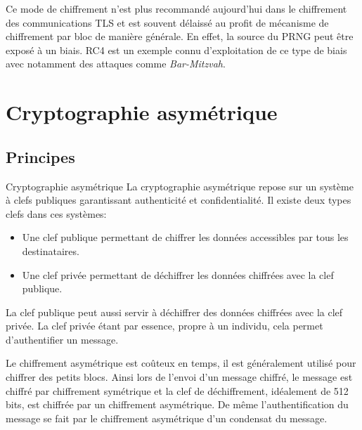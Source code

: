 Ce mode de chiffrement n'est plus recommandé aujourd'hui dans le chiffrement des communications TLS et est souvent délaissé au profit de mécanisme de chiffrement par bloc de manière générale. En effet, la source du PRNG peut être exposé à un biais. RC4 est un exemple connu d'exploitation de ce type de biais avec notamment des attaques comme \textit{Bar-Mitzvah}.\\


\section{Cryptographie asymétrique}
\subsection{Principes}
\begin{Define}{Cryptographie asymétrique}
La cryptographie asymétrique repose sur un système à clefs publiques garantissant authenticité et confidentialité. Il existe deux types clefs dans ces systèmes:\begin{itemize}
\item Une clef publique permettant de chiffrer les données accessibles par tous les destinataires.
\item Une clef privée permettant de déchiffrer les données chiffrées avec la clef publique.
\end{itemize}
La clef publique peut aussi servir à déchiffrer des données chiffrées avec la clef privée. La clef privée étant par essence, propre à un individu, cela permet d'authentifier un message.
\end{Define}
\begin{Warning}
Le chiffrement asymétrique est coûteux en temps, il est généralement utilisé pour chiffrer des petits blocs. Ainsi lors de l'envoi d'un message chiffré, le message est chiffré par chiffrement symétrique et la clef de déchiffrement, idéalement de 512 bits, est chiffrée par un chiffrement asymétrique. De même l'authentification du message se fait par le chiffrement asymétrique d'un condensat du message.
\end{Warning}

